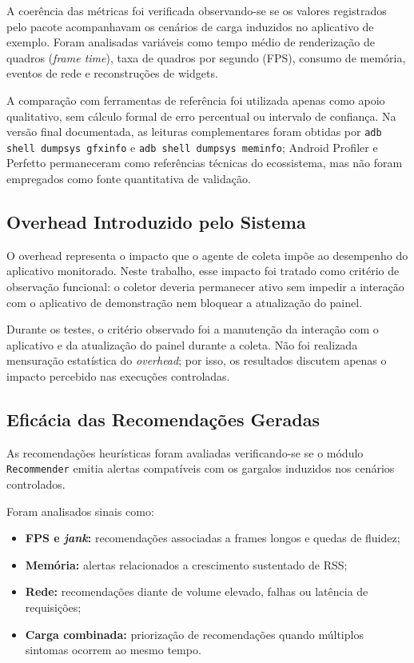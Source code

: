 A coerência das métricas foi verificada observando-se se os valores registrados pelo pacote acompanhavam os cenários de carga induzidos no aplicativo de exemplo. Foram analisadas variáveis como tempo médio de renderização de quadros (\textit{frame time}), taxa de quadros por segundo (FPS), consumo de memória, eventos de rede e reconstruções de widgets.

A comparação com ferramentas de referência foi utilizada apenas como apoio qualitativo, sem cálculo formal de erro percentual ou intervalo de confiança. Na versão final documentada, as leituras complementares foram obtidas por \texttt{adb shell dumpsys gfxinfo} e \texttt{adb shell dumpsys meminfo}; Android Profiler e Perfetto permaneceram como referências técnicas do ecossistema, mas não foram empregados como fonte quantitativa de validação.

\subsection{Overhead Introduzido pelo Sistema}

O overhead representa o impacto que o agente de coleta impõe ao desempenho do aplicativo monitorado.
Neste trabalho, esse impacto foi tratado como critério de observação funcional: o coletor deveria permanecer ativo sem impedir a interação com o aplicativo de demonstração nem bloquear a atualização do painel.

Durante os testes, o critério observado foi a manutenção da interação com o aplicativo e da atualização do painel durante a coleta. Não foi realizada mensuração estatística do \textit{overhead}; por isso, os resultados discutem apenas o impacto percebido nas execuções controladas.

\subsection{Eficácia das Recomendações Geradas}

As recomendações heurísticas foram avaliadas verificando-se se o módulo \texttt{Recommender} emitia alertas compatíveis com os gargalos induzidos nos cenários controlados.

Foram analisados sinais como:
\begin{itemize}
  \item \textbf{FPS e \textit{jank}:} recomendações associadas a frames longos e quedas de fluidez;
  \item \textbf{Memória:} alertas relacionados a crescimento sustentado de RSS;
  \item \textbf{Rede:} recomendações diante de volume elevado, falhas ou latência de requisições;
  \item \textbf{Carga combinada:} priorização de recomendações quando múltiplos sintomas ocorrem ao mesmo tempo.
\end{itemize}

